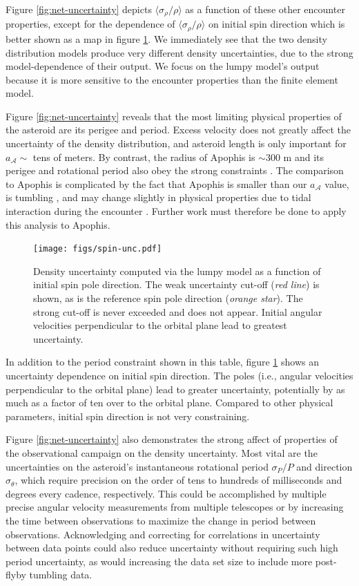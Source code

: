 \documentclass[fleqn,usenatbib]{mnras}
\begin{document}
Figure \ref{fig:net-uncertainty} depicts $\langle \sigma_\rho / \rho \rangle$ as a function of these other encounter properties, except for the dependence of $\langle \sigma_\rho / \rho \rangle$ on initial spin direction which is better shown as a map in figure \ref{fig:spin-uncertainty}. We immediately see that the two density distribution models produce very different density uncertainties, due to the strong model-dependence of their output. We focus on the lumpy model's output because it is more sensitive to the encounter properties than the finite element model. 

Figure \ref{fig:net-uncertainty} reveals that the most limiting physical properties of the asteroid are its perigee and period. Excess velocity does not greatly affect the uncertainty of the density distribution, and asteroid length is only important for $a_\mathcal{A}\sim$ tens of meters. By contrast, the radius of Apophis is  $\sim 300$ m and its perigee and rotational period also obey the strong constraints \citep{giorgini2008predicting}. The comparison to Apophis is complicated by the fact that Apophis is smaller than our $a_\mathcal{A}$ value, is tumbling \citep{PRAVEC201448}, and may change slightly in physical properties due to tidal interaction during the encounter \citep{yu2014numerical,hirabayashi2021finite}. Further work must therefore be done to apply this analysis to Apophis.

\begin{figure}
  \centering
  \texttt{[image: figs/spin-unc.pdf]}
  \caption{Density uncertainty computed via the lumpy model as a function of initial spin pole direction. The weak uncertainty cut-off (\textit{red line}) is shown, as is the reference spin pole direction (\textit{orange star}). The strong cut-off is never exceeded and does not appear. Initial angular velocities perpendicular to the orbital plane lead to greatest uncertainty.}
  \label{fig:spin-uncertainty}
\end{figure}

In addition to the period constraint shown in this table, figure \ref{fig:spin-uncertainty} shows an uncertainty dependence on initial spin direction. The poles (i.e., angular velocities perpendicular to the orbital plane) lead to greater uncertainty, potentially by as much as a factor of ten over to the orbital plane. Compared to other physical parameters, initial spin direction is not very constraining.

Figure \ref{fig:net-uncertainty} also demonstrates the strong affect of properties of the observational campaign on the density uncertainty. Most vital are the uncertainties on the asteroid's instantaneous rotational period $\sigma_P / P$ and direction $\sigma_\theta$, which require precision on the order of tens to hundreds of milliseconds and degrees every cadence, respectively. This could be accomplished by multiple precise angular velocity measurements from multiple telescopes or by increasing the time between observations to maximize the change in period between observations. Acknowledging and correcting for correlations in uncertainty between data points could also reduce uncertainty without requiring such high period uncertainty, as would increasing the data set size to include more post-flyby tumbling data.
\end{document}

